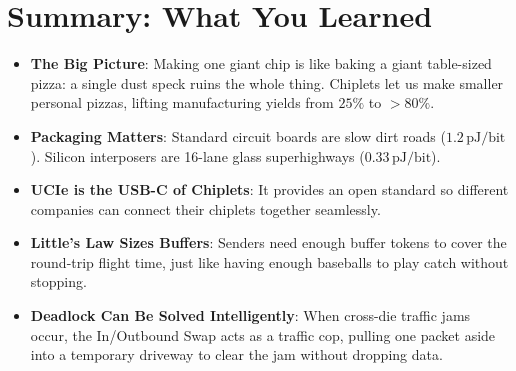\section{Summary: What You Learned}
\label{sec:ch9_summary}

\begin{itemize}
    \item \textbf{The Big Picture}: Making one giant chip is like baking a giant table-sized pizza: a single dust speck ruins the whole thing. Chiplets let us make smaller personal pizzas, lifting manufacturing yields from $25\%$ to $>80\%$.
    \item \textbf{Packaging Matters}: Standard circuit boards are slow dirt roads ($1.2\,\mathrm{pJ/bit}$). Silicon interposers are 16-lane glass superhighways ($0.33\,\mathrm{pJ/bit}$).
    \item \textbf{UCIe is the USB-C of Chiplets}: It provides an open standard so different companies can connect their chiplets together seamlessly.
    \item \textbf{Little's Law Sizes Buffers}: Senders need enough buffer tokens to cover the round-trip flight time, just like having enough baseballs to play catch without stopping.
    \item \textbf{Deadlock Can Be Solved Intelligently}: When cross-die traffic jams occur, the In/Outbound Swap acts as a traffic cop, pulling one packet aside into a temporary driveway to clear the jam without dropping data.
\end{itemize}

